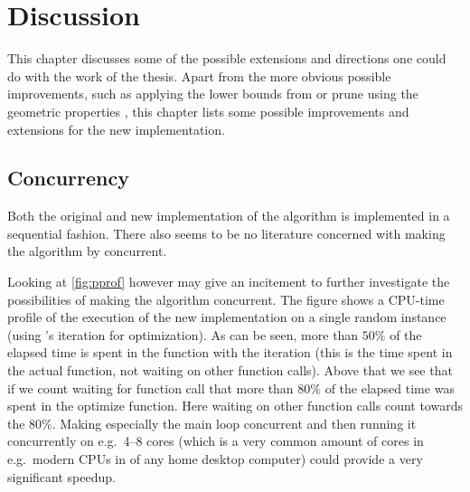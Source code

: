 {
\abnormalparskip{0pt}
\chapter{Discussion}
\label{cha:discussion}
}

This chapter discusses some of the possible extensions and directions one could
do with the work of the thesis. Apart from the more obvious possible
improvements, such as applying the lower bounds from \textcite{fampa2008} or prune
using the geometric properties \textcite{vanlaarhoven2013}, this chapter lists
some possible improvements and extensions for the new implementation.

\section{Concurrency}
\label{sec:concurrency}

Both the original and new implementation of the algorithm is implemented in a
sequential fashion. There also seems to be no literature concerned with making
the algorithm by \citeauthor{smith1992} concurrent.

Looking at \cref{fig:pprof} however may give an incitement to further
investigate the possibilities of making the algorithm concurrent. The figure
shows a CPU-time profile of the execution of the new implementation on a single
random instance (using \citeauthor{smith1992}'s iteration for optimization). As
can be seen, more than $50\%$ of the elapsed time is spent in the function with
the iteration (this is the time spent in the actual function, not waiting on
other function calls). Above that we see that if we count waiting for function
call that more than $80\%$ of the elapsed time was spent in the optimize
function. Here waiting on other function calls count towards the $80\%$. Making
especially the main loop concurrent and then running it concurrently on e.g.\
4--8 cores (which is a very common amount of cores in e.g.\ modern CPUs in of
any home desktop computer) could provide a very significant speedup.

